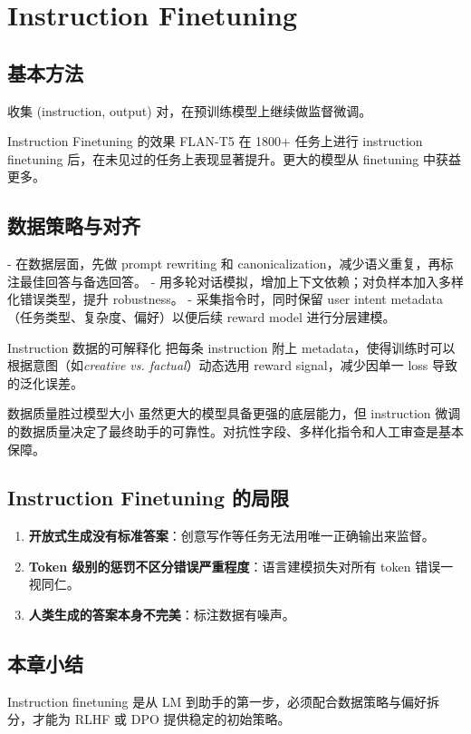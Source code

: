 \section{Instruction Finetuning}

\subsection{基本方法}

收集 (instruction, output) 对，在预训练模型上继续做监督微调。

\begin{importantbox}{Instruction Finetuning 的效果}
FLAN-T5 在 1800+ 任务上进行 instruction finetuning 后，在未见过的任务上表现显著提升。更大的模型从 finetuning 中获益更多。
\end{importantbox}

\subsection{数据策略与对齐}

- 在数据层面，先做 prompt rewriting 和 canonicalization，减少语义重复，再标注最佳回答与备选回答。
- 用多轮对话模拟，增加上下文依赖；对负样本加入多样化错误类型，提升 robustness。
- 采集指令时，同时保留 user intent metadata（任务类型、复杂度、偏好）以便后续 reward model 进行分层建模。

\begin{knowledgebox}{Instruction 数据的可解释化}
把每条 instruction 附上 metadata，使得训练时可以根据意图（如\textit{creative vs. factual}）动态选用 reward signal，减少因单一 loss 导致的泛化误差。
\end{knowledgebox}

\begin{importantbox}{数据质量胜过模型大小}
虽然更大的模型具备更强的底层能力，但  instruction 微调的数据质量决定了最终助手的可靠性。对抗性字段、多样化指令和人工审查是基本保障。
\end{importantbox}

\subsection{Instruction Finetuning 的局限}

\begin{enumerate}
    \item \textbf{开放式生成没有标准答案}：创意写作等任务无法用唯一正确输出来监督。
    \item \textbf{Token 级别的惩罚不区分错误严重程度}：语言建模损失对所有 token 错误一视同仁。
    \item \textbf{人类生成的答案本身不完美}：标注数据有噪声。
\end{enumerate}

\subsection{本章小结}

Instruction finetuning 是从 LM 到助手的第一步，必须配合数据策略与偏好拆分，才能为 RLHF 或 DPO 提供稳定的初始策略。

